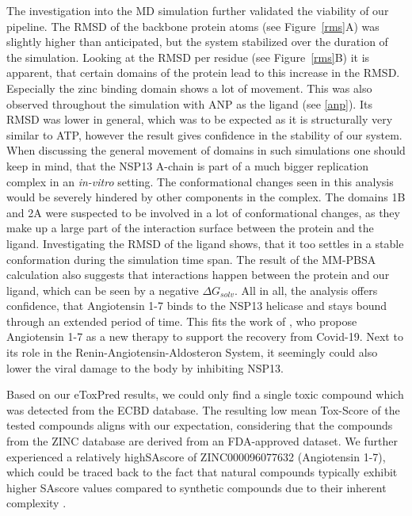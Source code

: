 \documentclass[11pt, letterpaper, titlepage]{article}
\renewcommand{\cite}{\parencite}
\begin{document}
\noindent The investigation into the \acf{MD} simulation further validated the viability of our pipeline. The RMSD of the backbone protein atoms (see Figure~\ref{rms}A) was slightly higher than anticipated, but the system stabilized over the duration of the simulation. Looking at the RMSD per residue (see Figure~\ref{rms}B) it is apparent, that certain domains of the protein lead to this increase in the RMSD. Especially the zinc binding domain shows a lot of movement. This was also observed throughout the simulation with ANP as the ligand (see \ref{anp}). Its RMSD was lower in general, which was to be expected as it is structurally very similar to ATP, however the result gives confidence in the stability of our system. When discussing the general movement of domains in such simulations one should keep in mind, that the NSP13 A-chain is part of a much bigger replication complex \cite{NSP13_basics} in an \textit{in-vitro} setting. The conformational changes seen in this analysis would be severely hindered by other components in the complex. The domains 1B and 2A were suspected to be involved in a lot of conformational changes, as they make up a large part of the interaction surface between the protein and the ligand. Investigating the RMSD of the ligand shows, that it too settles in a stable conformation during the simulation time span. The result of the \ac{MM-PBSA} calculation also suggests that interactions happen between the protein and our ligand, which can be seen by a negative $\Delta G_{solv}$.
All in all, the analysis offers confidence, that Angiotensin 1-7 binds to the NSP13 helicase and stays bound through an extended period of time. This fits the work of \textcite{angio}, who propose Angiotensin 1-7 as a new therapy to support the recovery from Covid-19. Next to its role in the Renin-Angiotensin-Aldosteron System, it seemingly could also lower the viral damage to the body by inhibiting NSP13.

Based on our eToxPred results, we could only find a single toxic compound which was detected from the ECBD database. The resulting low mean Tox-Score of the tested compounds aligns with our expectation, considering that the compounds from the ZINC database are derived from an \ac{FDA}-approved dataset. We further experienced a relatively high\ac{SAscore} of ZINC000096077632 (Angiotensin 1-7), which could be traced back to the fact that natural compounds typically exhibit higher \ac{SAscore} values compared to synthetic compounds due to their inherent complexity \cite{pu2019toxpred}.
\end{document}
